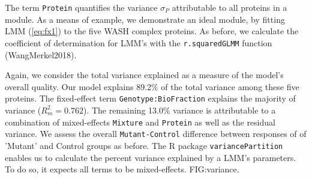 \documentclass[11pt]{elife}
\begin{document}
The term \texttt{Protein} quantifies the variance $\sigma_P$ attributable to all
proteins in a module.  As a means of example, we demonstrate an ideal module, by
fitting LMM (\ref{eq:fx1}) to the five WASH complex proteins.  As before, we
calculate the coefficient of determination for LMM's with the
\texttt{r.squaredGLMM} function (WangMerkel2018).\\


\begin{knitrout}
\color{fgcolor}
\end{knitrout}


Again, we consider the total variance explained as a measure of the model's
overall quality. Our model explains 89.2\% of the total variance among these
five proteins. The fixed-effect term \texttt{Genotype:BioFraction} explains the
majority of variance ($R^2_m=0.762$). The remaining 13.0\% variance is
attributable to a combination of mixed-effects \texttt{Mixture} and
\texttt{Protein} as well as the residual variance. We assess the overall
\texttt{Mutant-Control} difference between responses of of 'Mutant' and Control
groups as before. The R package \texttt{variancePartition} enables us to
calculate the percent variance explained by a LMM's parameters. To do so, it
expects all terms to be mixed-effects. FIG:variance.


\end{document}
